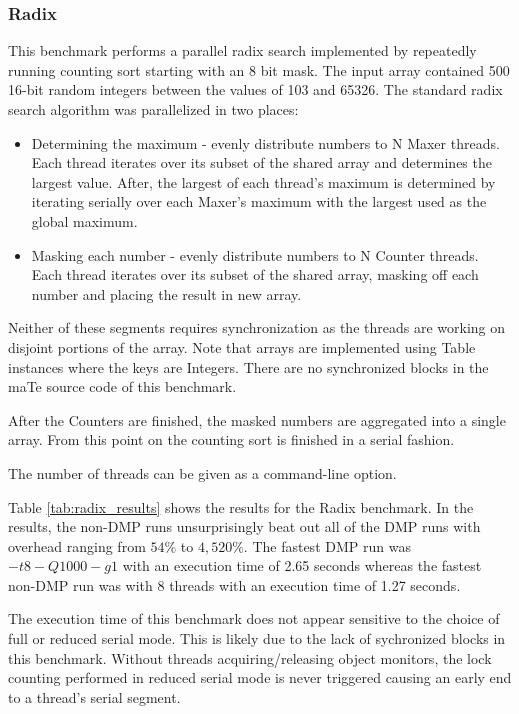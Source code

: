 \subsubsection{Radix}

This benchmark performs a parallel radix search implemented by
repeatedly running counting sort starting with an 8 bit mask.  The
input array contained 500 16-bit random integers between the values of
103 and 65326.  The standard radix search algorithm was parallelized
in two places:

\begin{itemize}
\item Determining the maximum - evenly distribute numbers to N Maxer
  threads.  Each thread iterates over its subset of the shared array
  and determines the largest value.  After, the largest of each
  thread's maximum is determined by iterating serially over each
  Maxer's maximum with the largest used as the global maximum.

\item Masking each number - evenly distribute numbers to N Counter
  threads.  Each thread iterates over its subset of the shared array,
  masking off each number and placing the result in new array.
\end{itemize}

Neither of these segments requires synchronization as the threads are
working on disjoint portions of the array.  Note that arrays are
implemented using Table instances where the keys are Integers.  There
are no synchronized blocks in the maTe source code of this benchmark.

After the Counters are finished, the masked numbers are aggregated
into a single array.  From this point on the counting sort is finished
in a serial fashion.

The number of threads can be given as a command-line option.

Table \ref{tab:radix_results} shows the results for the Radix
benchmark.  In the results, the non-DMP runs unsurprisingly beat out
all of the DMP runs with overhead ranging from $54\%$ to $4,520\%$.
The fastest DMP run was $-t8 -Q1000 -g1$ with an execution time of
2.65 seconds whereas the fastest non-DMP run was with 8 threads with
an execution time of 1.27 seconds.

The execution time of this benchmark does not appear sensitive to the
choice of full or reduced serial mode.  This is likely due to the lack
of sychronized blocks in this benchmark.  Without threads
acquiring/releasing object monitors, the lock counting performed in
reduced serial mode is never triggered causing an early end to a
thread's serial segment.

